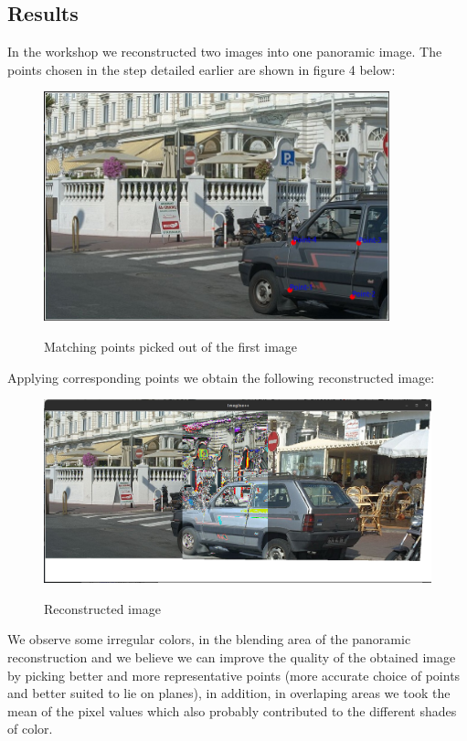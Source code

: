 \documentclass{article}
\begin{document}
\subsection{Results}
In the workshop we reconstructed two images into one panoramic image. The points chosen in the step detailed earlier are shown in figure 4 below:
\begin{figure}%
    \centering
    {\includegraphics[width=10cm]{points.png}}%
    \caption{Matching points picked out of the first image}%
    \label{fig:example}%
\end{figure}

Applying corresponding points we obtain the following reconstructed image:
\begin{figure}%
    \centering
    {\includegraphics[width=15cm]{reconstructed.png}}%
    \caption{Reconstructed image}%
    \label{fig:example}%
\end{figure}
We observe some irregular colors, in the blending area of the panoramic reconstruction and we believe we can improve the quality of the obtained image by picking better and more representative points (more accurate choice of points and better suited to lie on planes), in addition, in overlaping areas we took the mean of the pixel values which also probably contributed to the different shades of color.
\end{document}
